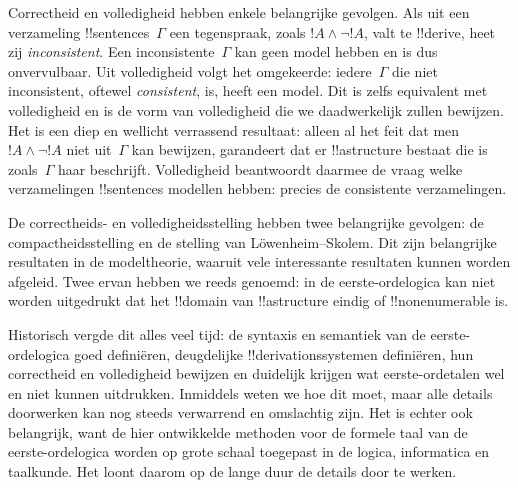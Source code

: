 \documentclass[openany]{memoir}
\begin{document}
Correctheid en volledigheid hebben enkele belangrijke gevolgen. Als uit
een verzameling !!{sentence}s~$\Gamma$ een tegenspraak, zoals
$!A \land \lnot !A$, valt te !!{derive}, heet zij \emph{inconsistent}.
Een inconsistente~$\Gamma$ kan geen model hebben en is dus
onvervulbaar. Uit volledigheid volgt het omgekeerde: iedere~$\Gamma$ die
niet inconsistent, oftewel \emph{consistent}, is, heeft een model. Dit
is zelfs equivalent met volledigheid en is de vorm van volledigheid die
we daadwerkelijk zullen bewijzen. Het is een diep en wellicht
verrassend resultaat: alleen al het feit dat men
$!A \land \lnot !A$ niet uit~$\Gamma$ kan bewijzen, garandeert dat er !!a{structure}
bestaat die is zoals~$\Gamma$ haar beschrijft. Volledigheid beantwoordt
daarmee de vraag welke verzamelingen !!{sentence}s modellen hebben:
precies de consistente verzamelingen.

De correctheids- en volledigheidsstelling hebben twee belangrijke
gevolgen: de compactheidsstelling en de stelling van
L\"owenheim--Skolem. Dit zijn belangrijke resultaten in de modeltheorie,
waaruit vele interessante resultaten kunnen worden afgeleid. Twee
ervan hebben we reeds genoemd: in de eerste-ordelogica kan niet worden
uitgedrukt dat het !!{domain} van !!a{structure} eindig of
!!{nonenumerable} is.

Historisch vergde dit alles veel tijd: de syntaxis en semantiek van de
eerste-ordelogica goed definiëren, deugdelijke !!{derivation}ssystemen
definiëren, hun correctheid en volledigheid bewijzen en duidelijk
krijgen wat eerste-ordetalen wel en niet kunnen uitdrukken. Inmiddels
weten we hoe dit moet, maar alle details doorwerken kan nog steeds
verwarrend en omslachtig zijn. Het is echter ook belangrijk, want de
hier ontwikkelde methoden voor de formele taal van de eerste-ordelogica
worden op grote schaal toegepast in de logica, informatica en
taalkunde. Het loont daarom op de lange duur de details door te werken.
\endgroup
\OLEndChapterHook

\begingroup
\def\olfilename{OLP-0149}
\def\olfilepath{content/first-order-logic/syntax-and-semantics/}
\hypertarget{unit-OLP-0149}{}
\end{document}
